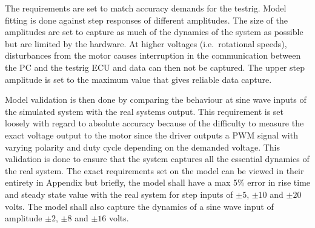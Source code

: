 The requirements are set to match accuracy demands for the testrig. Model fitting
is done against step responses of different amplitudes. The size of the amplitudes
are set to capture as much of the dynamics of the system as possible but are limited
by the hardware. At higher voltages (i.e.\ rotational speeds), disturbances from the
motor causes interruption in the communication between the PC and the testrig
ECU and data can then not be captured. The upper step amplitude is set to the 
maximum value that gives reliable data capture. 

Model validation is then done by comparing the behaviour at sine wave inputs of
the simulated system with the real systems output.  This requirement is set
loosely with regard to absolute accuracy because of the difficulty to measure
the exact voltage output to the motor since the driver outputs a PWM signal with
varying polarity and duty cycle depending on the demanded voltage. This
validation is done to ensure that the system captures all the essential dynamics
of the real system. The exact requirements set on the model can be viewed in
their entirety in Appendix %
but briefly, the model shall have a  max 5\% error in rise time and steady state
value with the real system for step inputs of $\pm5$, $\pm10$ and $\pm20$ volts.
The model shall also capture the dynamics of a sine wave input of amplitude
$\pm2$, $\pm8$ and $\pm16$ volts.

